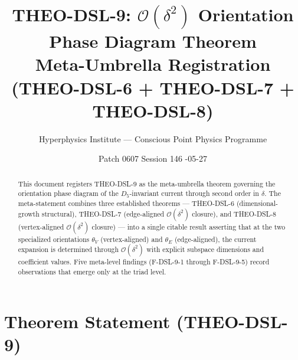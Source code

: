 \documentclass[11pt]{article}
\title{THEO-DSL-9: $\mathcal{O}(\delta^2)$ Orientation Phase Diagram Theorem \\[2pt]
\large Meta-Umbrella Registration (THEO-DSL-6 + THEO-DSL-7 + THEO-DSL-8)}
\author{Hyperphysics Institute --- Conscious Point Physics Programme}
\date{Patch 0607 \quad Session 146 \quad 2026-05-27}
\begin{document}
\maketitle

\begin{abstract}
This document registers THEO-DSL-9 as the meta-umbrella theorem
governing the orientation phase diagram of the $D_5$-invariant current
through second order in $\delta$. The meta-statement combines three
established theorems --- THEO-DSL-6 (dimensional-growth structural),
THEO-DSL-7 (edge-aligned $\mathcal{O}(\delta^2)$ closure), and
THEO-DSL-8 (vertex-aligned $\mathcal{O}(\delta^2)$ closure) --- into a
single citable result asserting that at the two specialized orientations
$\theta_V$ (vertex-aligned) and $\theta_E$ (edge-aligned), the current
expansion is determined through $\mathcal{O}(\delta^2)$ with explicit
subspace dimensions and coefficient values. Five meta-level findings
(F-DSL-9-1 through F-DSL-9-5) record observations that emerge only at
the triad level.
\end{abstract}

\section{Theorem Statement (THEO-DSL-9)}
\end{document}
